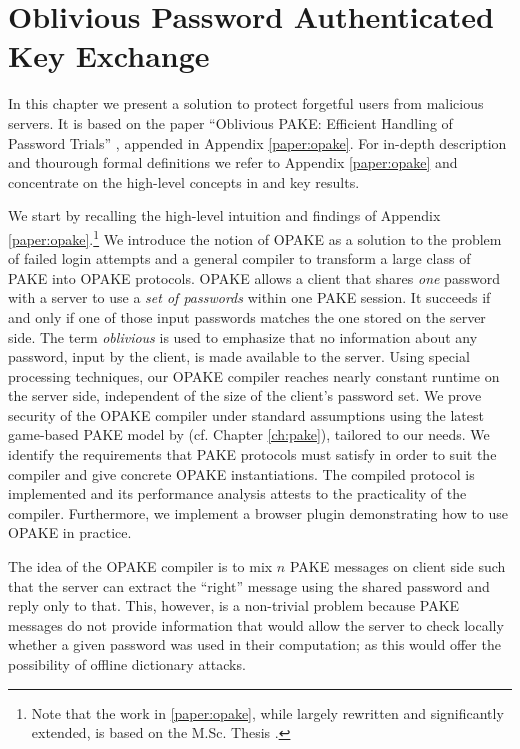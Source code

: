 \chapter{Oblivious Password Authenticated Key Exchange}\label{ch:opake}
In this chapter we present a solution to protect forgetful users from malicious servers.
It is based on the paper ``Oblivious PAKE: Efficient Handling of Password Trials'' \cite{Kiefer13a}, appended in Appendix \ref{paper:opake}.
For in-depth description and thourough formal definitions we refer to Appendix \ref{paper:opake} and concentrate on the high-level concepts in and key results.

We start by recalling the high-level intuition and findings of Appendix \ref{paper:opake}.\footnote{Note that the work in \ref{paper:opake}, while largely rewritten and significantly extended, is based on the M.Sc. Thesis \cite{Kiefer2012}.}
We introduce the notion of \acl{OPAKE} as a solution to the problem of failed login attempts and a general compiler to transform a large class of \ac{PAKE} into \ac{OPAKE} protocols.
\ac{OPAKE} allows a client that shares \emph{one} password with a server to use a \emph{set of passwords} within one \ac{PAKE} session.
It succeeds if and only if one of those input passwords matches the one stored on the server side.
The term \emph{oblivious} is used to emphasize that no information about any password, input by the client, is made available to the server.
Using special processing techniques, our \ac{OPAKE} compiler reaches nearly constant runtime on the server side, independent of the size of the client's password set.
We prove security of the \ac{OPAKE} compiler under standard assumptions using the latest game-based \ac{PAKE} model by \citeauthor{Abdalla2005} (cf. Chapter \ref{ch:pake}), tailored to our needs.
We identify the requirements that \ac{PAKE} protocols must satisfy in order to suit the compiler and give concrete \ac{OPAKE} instantiations.
The compiled protocol is implemented and its performance analysis attests to the practicality of the compiler.
Furthermore, we implement a browser plugin demonstrating how to use \ac{OPAKE} in practice.

The idea of the \ac{OPAKE} compiler is to mix $n$ \ac{PAKE} messages on client side such that the server can extract the ``right'' message using the shared password and reply only to that.
This, however, is a non-trivial problem because \ac{PAKE} messages do not provide information that would allow the server to check locally whether a given password was used in their computation; as this would offer the possibility of offline dictionary attacks.

